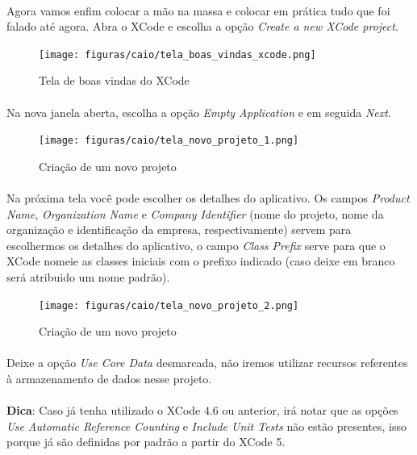 \documentclass[a4paper,12pt,brazil,doubleside]{book}
\begin{document}
\begin{singlespace}
\paragraph{}Agora vamos enfim colocar a mão na massa e colocar em prática tudo que foi falado até agora. Abra o XCode e escolha a opção \emph{Create a new XCode project}.

\begin{figure}[H]
  \centering
  \texttt{[image: figuras/caio/tela\_boas\_vindas\_xcode.png]}
  \caption{Tela de boas vindas do XCode}
  \label{fig:a}
\end{figure}

\paragraph{}Na nova janela aberta, escolha a opção \emph{Empty Application} e em seguida \emph{Next}.

\begin{figure}[H]
  \centering
  \texttt{[image: figuras/caio/tela\_novo\_projeto\_1.png]}
  \caption{Criação de um novo projeto}
  \label{fig:a}
\end{figure}

\paragraph{}Na próxima tela você pode escolher os detalhes do aplicativo. Os campos \emph{Product Name}, \emph{Organization Name} e \emph{Company Identifier} (nome do projeto, nome da organização e identificação da empresa, respectivamente) servem para escolhermos os detalhes do aplicativo, o campo \emph{Class Prefix} serve para que o XCode nomeie as classes iniciais com o prefixo indicado (caso deixe em branco será atribuido um nome padrão).

\begin{figure}[H]
  \centering
  \texttt{[image: figuras/caio/tela\_novo\_projeto\_2.png]}
  \caption{Criação de um novo projeto}
  \label{fig:a}
\end{figure}

\paragraph{}Deixe a opção \emph{Use Core Data} desmarcada, não iremos utilizar recursos referentes à armazenamento de dados nesse projeto.

\begin{framed}
\paragraph{}\textbf{Dica}: Caso já tenha utilizado o XCode 4.6 ou anterior, irá notar que as opções 
\textit{ Use Automatic Reference Counting } e \textit{ Include Unit Tests } não estão presentes, isso porque já são definidas por padrão a partir do XCode 5.
\end{framed}


\end{singlespace}
\end{document}
